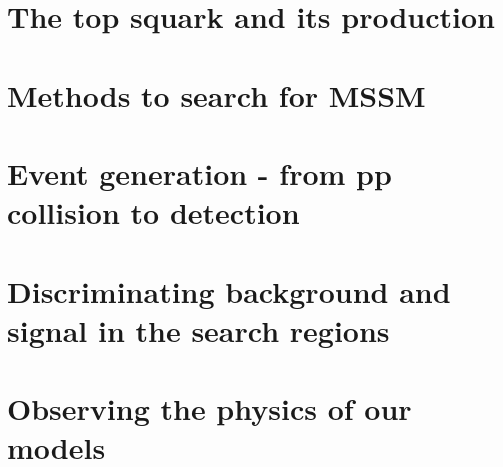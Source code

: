 \documentclass[12pt,a4paper]{report}
\begin{document}
\chapter{The top squark and its production}


\chapter{Methods to search for MSSM}


\chapter{Event generation - from pp collision to detection}




\chapter{Discriminating background and signal in the search regions}


\chapter{Observing the physics of our models}

\end{document}
